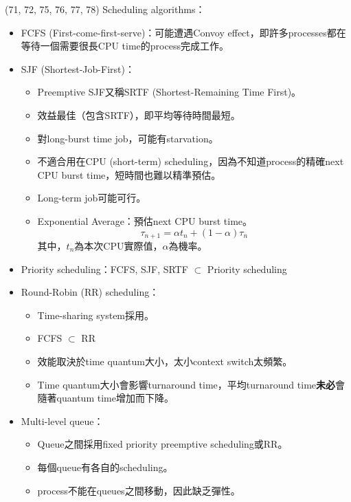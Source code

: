 \item \begin{theorem}{(71, 72, 75, 76, 77, 78)} Scheduling algorithms： \begin{itemize}
        \item FCFS (First-come-first-serve)：可能遭遇Convoy effect，即許多processes都在等待一個需要很長CPU time的process完成工作。
        \item SJF (Shortest-Job-First)：\begin{itemize}
            \item Preemptive SJF又稱SRTF (Shortest-Remaining Time First)。
            \item 效益最佳（包含SRTF），即平均等待時間最短。
            \item 對long-burst time job，可能有starvation。
            \item 不適合用在CPU (short-term) scheduling，因為不知道process的精確next CPU burst time，短時間也難以精準預估。
            \item Long-term job可能可行。
            \item Exponential Average：預估next CPU burst time。\begin{equation}
                \tau_{n + 1} = \alpha t_n + (1 - \alpha)\tau_n
            \end{equation} 其中，$t_n$為本次CPU實際值，$\alpha$為機率。
        \end{itemize}
        \item Priority scheduling：FCFS, SJF, SRTF $\subset$ Priority scheduling
        \item Round-Robin (RR) scheduling：\begin{itemize}
            \item Time-sharing system採用。
            \item FCFS $\subset$ RR
            \item 效能取決於time quantum大小，太小context switch太頻繁。
            \item Time quantum大小會影響turnaround time，平均turnaround time\textbf{未必}會隨著quantum time增加而下降。
        \end{itemize}
        \item Multi-level queue：\begin{itemize}
            \item Queue之間採用fixed priority preemptive scheduling或RR。
            \item 每個queue有各自的scheduling。
            \item process不能在queues之間移動，因此缺乏彈性。

\end{itemize}
\end{itemize}
\end{theorem}
